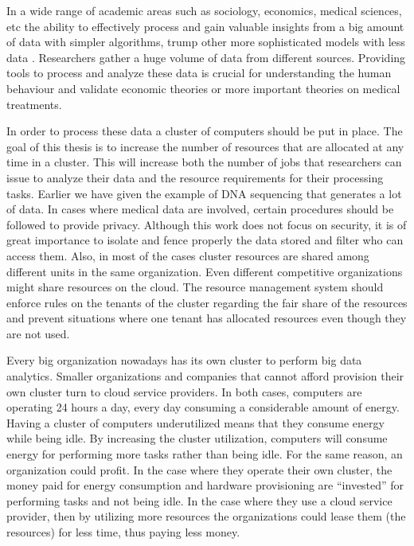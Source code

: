 In a wide range of academic areas such as sociology, economics,
medical sciences, etc the ability to effectively process and gain
valuable insights from a big amount of data with simpler algorithms,
trump other more sophisticated models with less data
\cite{10.1109/MIS.2009.36}. Researchers gather a huge volume of data
from different sources. Providing tools to process and analyze these
data is crucial for understanding the human behaviour and validate
economic theories or more important theories on medical treatments.

In order to process these data a cluster of computers should be put in
place. The goal of this thesis is to increase the number of resources
that are allocated at any time in a cluster. This will increase both the
number of jobs that researchers can issue to analyze their data and
the resource requirements for their processing tasks. Earlier we have
given the example of DNA sequencing that generates a lot of data. In
cases where medical data are involved, certain procedures should be
followed to provide privacy. Although this work does not focus on
security, it is of great importance to isolate and fence properly the
data stored and filter who can access them. Also, in most of the
cases cluster resources are shared among different units in the same
organization. Even different competitive organizations might share resources on
the cloud. The resource management system should enforce rules on the
tenants of the cluster regarding the fair share of the resources and
prevent situations where one tenant has allocated resources even
though they are not used.

Every big organization nowadays has its own cluster to perform big
data analytics. Smaller organizations and companies that cannot afford
provision their own cluster turn to cloud service providers. In both
cases, computers are operating 24 hours a day, every day consuming
a considerable amount of energy. Having a cluster of computers
underutilized means that they consume energy while being idle. By
increasing the cluster utilization, computers will consume energy for
performing more tasks rather than being idle. For the same reason, an
organization could profit. In the case where they operate their own
cluster, the money paid for energy consumption and hardware
provisioning are ``invested'' for performing tasks and not being
idle. In the case where they use a cloud service provider, then by
utilizing more resources the organizations could lease them (the
resources) for less time, thus paying less money.